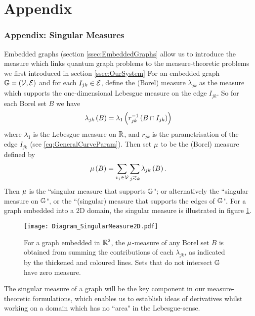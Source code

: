 \section{Appendix} \label{sec:Appendix}

\subsubsection{Appendix: Singular Measures} \label{ssec:SingularMeasures}
Embedded graphs (section \ref{ssec:EmbeddedGraphs} allow us to introduce the measure which links quantum graph problems to the measure-theoretic problems we first introduced in section \ref{ssec:OurSystem}
For an embedded graph $\mathbb{G} = \left( \mathcal{V},\mathcal{E} \right)$ and for each $I_{jk}\in \mathcal{E}$, define the (Borel) measure $\lambda_{jk}$ as the measure which supports the one-dimensional Lebesgue measure on the edge $I_{jk}$.
So for each Borel set $B$ we have
\begin{align*}
	\lambda_{jk}\left( B \right) = \lambda_{1}\left( r_{jk}^{-1}\left( B \cap I_{jk} \right) \right)
\end{align*}
where $\lambda_1$ is the Lebesgue measure on $\mathbb{R}$, and $r_{jk}$ is the parametrisation of the edge $I_{jk}$ (see \eqref{eq:GeneralCurveParam}).
Then set $\mu$ to be the (Borel) measure defined by
\begin{align*}
	\ddmes\bracs{B} = \sum_{v_j\in \vertSet}\sum_{j\conLeft k} \lambda_{jk}\bracs{B}.
\end{align*}
Then $\mu$ is the ``singular measure that supports $\mathbb{G}$"; or alternatively the ``singular measure on $\mathbb{G}$", or the ``(singular) measure that supports the edges of $\mathbb{G}$". 
For a graph embedded into a 2D domain, the singular measure is illustrated in figure \ref{fig:Diagram_SingularMeasure2D}.
\begin{figure}[b!]
	\centering
	\texttt{[image: Diagram\_SingularMeasure2D.pdf]}
	\caption{\label{fig:Diagram_SingularMeasure2D} For a graph embedded in $\mathbb{R}^2$, the $\mu$-measure of any Borel set $B$ is obtained from summing the contributions of each $\lambda_{jk}$, as indicated by the thickened and coloured lines.
	Sets that do not intersect $\mathbb{G}$ have zero measure.}
\end{figure} \newline
The singular measure of a graph will be the key component in our measure-theoretic formulations, which enables us to establish ideas of derivatives whilst working on a domain which has no ``area" in the Lebesgue-sense.

